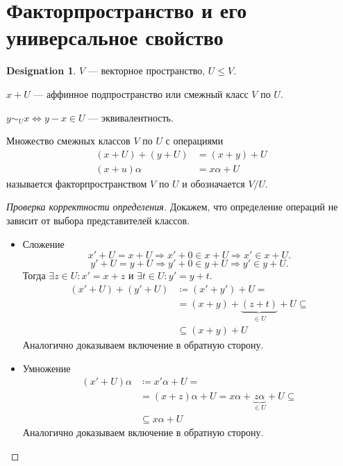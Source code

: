 \documentclass[11pt]{book}
\renewcommand{\le}{\leqslant}
\theoremstyle{definition}
\theoremstyle{plain}
\theoremstyle{plain}
\theoremstyle{definition}
\newtheorem*{name}{Designation}
\theoremstyle{remark}
\begin{document}
\section{Факторпространство и его универсальное свойство}
\begin{name}
    $ V$ --- векторное пространство,  $ U \le V$.
\end{name}
\begin{defn}
    $ x + U$ --- аффинное подпространство или смежный класс  $ V$ по  $ U$.

    $ y \sim _{U} x \Longleftrightarrow y - x \in U$ --- эквивалентность.
\end{defn}
\begin{defn}
    Множество смежных классов $ V$ по  $ U$ с операциями
    \begin{align*}
	(x + U) + (y + U) &= (x+ y) + U  \\
	(x + u) \alpha &= x\alpha + U
    \end{align*}
    называется {\sf факторпространством} $ V$  по  $ U$ и обозначается  $ V / U$.
\end{defn}
\begin{proof}[Проверка корректности определения]
    Докажем, что определение операций не зависит от выбора представителей классов.
    \begin{itemize}
	\item Сложение \[
		x' + U = x + U \Longrightarrow x' + 0 \in x + U \Longrightarrow x' \in x + U
	    .\]
	    \[
		y' + U = y + U \Longrightarrow y' + 0 \in y + U \Longrightarrow y' \in y + U
	    .\]
	    Тогда $ \exists z \in U: x' = x + z$ и $ \exists t \in U: y' = y + t$.
	    \begin{align*}
		(x' + U) + (y' + U) & \coloneqq (x' + y') + U = \\
				    &= (x+y) + \underbrace{(z+t)}_{ \in U} + U \subseteq \\
				    &\subseteq (x+y) + U
	    \end{align*}
	    Аналогично доказываем включение в обратную сторону.
	\item  Умножение
	    \begin{align*}
		(x' + U) \alpha & \coloneqq x'\alpha + U = \\
				& = (x + z)\alpha + U = x\alpha + \underbrace{z\alpha}_{ \in U} + U \subseteq \\
				& \subseteq x\alpha + U
	    \end{align*}
	    Аналогично доказываем включение в обратную сторону.
    \end{itemize}
\end{proof}
\end{document}
